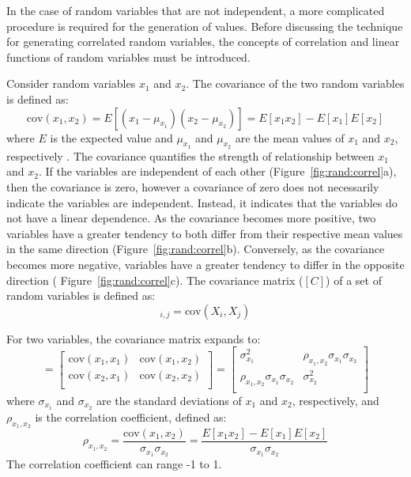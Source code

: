 \documentclass[11pt]{report}
\begin{document}

In the case of random variables that are not independent, a more complicated procedure is required
for the generation of values. Before discussing the technique for generating correlated random
variables, the concepts of correlation and linear functions of random variables must be introduced. 

Consider random variables $x_1$ and $x_2$.  The covariance of the two random variables is defined as:
\begin{equation}
  \textrm{cov}(x_1, x_2) = E[(x_1 - \mu_{x_1})(x_2 - \mu_{x_2})] = E[x_1 x_2] - E[x_1] E[x_2]
\end{equation}
where $E$ is the expected value and $\mu_{x_1}$ and $\mu_{x_2}$ are the mean values of $x_1$ and
$x_2$, respectively \citep{ang:vol1}.  The covariance quantifies the strength of relationship between
$x_1$ and $x_2$. If the variables are independent of each other (Figure~\ref{fig:rand:correl}a),
then the covariance is zero, however a covariance of zero does not necessarily indicate the
variables are independent. Instead, it indicates that the variables do not have a linear dependence.
As the covariance becomes more positive, two variables have a greater tendency to both differ from
their respective mean values in the same direction (Figure~\ref{fig:rand:correl}b).  Conversely, as
the covariance becomes more negative, variables have a greater tendency to differ in the opposite
direction ( Figure~\ref{fig:rand:correl}c).  The covariance matrix ($[C]$) of a set of random
variables is defined as:
\begin{equation}
  [C]_{i,j}  = \mathrm{cov}(X_i,X_j)
  \label{eq:covMatrix}
\end{equation}

For two variables, the covariance matrix expands to:
\begin{equation}
  [C] = 
  \left[
  \begin{array}{cc}
	\textrm{cov}(x_1, x_1) & \textrm{cov}(x_1, x_2 ) \\
	\textrm{cov}(x_2, x_1) & \textrm{cov}(x_2, x_2 ) \\
  \end{array}
  \right]
  = 
  \left[
  \begin{array}{cc}
	\sigma_{x_1} ^ 2 & \rho_{x_1, x_2} \sigma_{x_1} \sigma_{x_2} \\
	\rho_{x_1, x_2} \sigma_{x_1} \sigma_{x_2} & \sigma_{x_2} ^ 2 \\
  \end{array}
  \right]
\end{equation}
where $\sigma_{x_1}$ and $\sigma_{x_2}$ are the standard deviations of $x_1$ and $x_2$,
respectively, and $\rho_{x_1, x_2}$ is the correlation coefficient, defined as:
\begin{equation}
  \rho_{x_1,x_2} = \frac{\mathrm{cov}(x_1,x_2)}{\sigma_{x_1} \sigma_{x_2}} = 
  \frac{E[x_1 x_2] - E[x_1] E[x_2]}{\sigma_{x_1} \sigma_{x_2}}
  \label{eq:correlCoeff}
\end{equation}
The correlation coefficient can range -1 to 1.
\end{document}
